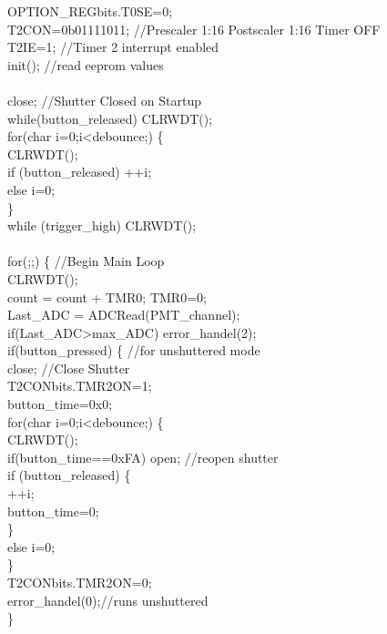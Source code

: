 \tabto*{.5cm} OPTION\_REGbits.T0SE=0;\\
\tabto*{.5cm}T2CON=0b01111011; \tabto*{7.5cm} //Prescaler 1:16 Postscaler 1:16 Timer OFF\\
\tabto*{.5cm} T2IE=1;  \tabto*{7.5cm}//Timer 2 interrupt enabled\\
\tabto*{.5cm} init(); \tabto*{7.5cm} //read eeprom values\\
\\
\tabto*{.5cm} close;\tabto*{7.5cm} //Shutter Closed on Startup\\
\tabto*{.5cm} while(button\_released) CLRWDT(); \\
\tabto*{.5cm} for(char i=0;i<debounce;) \{\\
\tabto*{1cm} CLRWDT();\\
\tabto*{1cm} if (button\_released) ++i;\\
\tabto*{1cm} else i=0;\\
\tabto*{.5cm} \}\\
\tabto*{.5cm} while (trigger\_high) CLRWDT();\\
\\ 
\tabto*{.5cm} for(;;) \{ \tabto*{7.5cm} //Begin Main Loop\\
\tabto*{1cm} CLRWDT();\\
\tabto*{1cm} count = count + TMR0; TMR0=0;\\
\tabto*{1cm} Last\_ADC = ADCRead(PMT\_channel);\\
\tabto*{1cm} if(Last\_ADC>max\_ADC) error\_handel(2);\\
\tabto*{1cm} if(button\_pressed) \{ \tabto*{7.5cm}//for unshuttered mode\\
\tabto*{1.5cm} close; \tabto*{7.5cm} //Close Shutter\\
\tabto*{1.5cm} T2CONbits.TMR2ON=1;\\
\tabto*{1.5cm} button\_time=0x0;\\
\tabto*{1.5cm} for(char i=0;i<debounce;) \{\\
\tabto*{2cm} CLRWDT();\\
\tabto*{2cm} if(button\_time==0xFA) open; \tabto*{7.5cm}  //reopen shutter\\
\tabto*{2cm} if (button\_released) \{ \\
\tabto*{2.5cm} ++i;\\
\tabto*{2.5cm} button\_time=0; \\
\tabto*{2cm} \}\\
\tabto*{2cm} else i=0;\\
\tabto*{1.5cm}\}\\
\tabto*{1.5cm} T2CONbits.TMR2ON=0;\\
\tabto*{1.5cm} error\_handel(0);\tabto*{7.5cm}//runs unshuttered\\
\tabto*{1cm}\}\\

